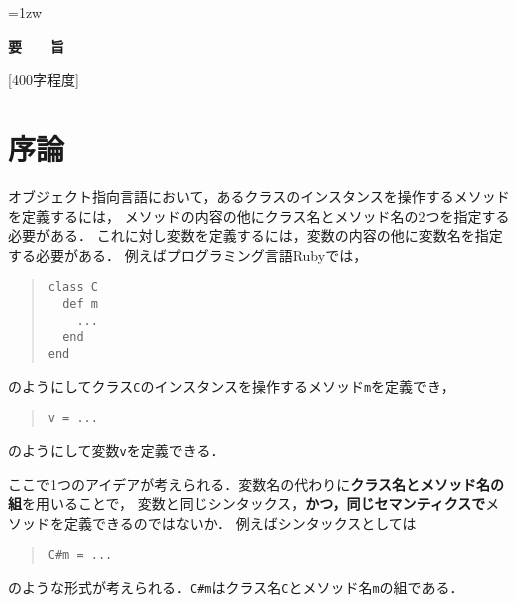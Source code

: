 \documentclass[a4paper,11pt,dvipdfmx]{jreport}
\title{\Underline{レキシカル環境にメソッドを定義する\\オブジェクト指向言語Suzu}}
\author{林 拓人}
\begin{document}
\maketitle
\thispagestyle{empty}
\newpage

\thispagestyle{empty}
\vspace*{20pt plus 1fil}
\parindent=1zw
\noindent
\begin{center}
{\Large \bf 要　　旨}
\vspace{2cm}
\end{center}
[400字程度]

\par
\vspace{0pt plus 1fil}
\newpage

\tableofcontents

\pagebreak \setcounter{page}{1}


\chapter{序論}

オブジェクト指向言語において，あるクラスのインスタンスを操作するメソッドを定義するには，
メソッドの内容の他にクラス名とメソッド名の2つを指定する必要がある．
これに対し変数を定義するには，変数の内容の他に変数名を指定する必要がある．
例えばプログラミング言語Rubyでは，
\begin{quote}
\begin{verbatim}
class C
  def m
    ...
  end
end
\end{verbatim}
\end{quote}
のようにしてクラス\verb|C|のインスタンスを操作するメソッド\verb|m|を定義でき，
\begin{quote}
\begin{verbatim}
v = ...
\end{verbatim}
\end{quote}
のようにして変数\verb|v|を定義できる．

ここで1つのアイデアが考えられる．変数名の代わりに\textbf{クラス名とメソッド名の組}を用いることで，
変数と同じシンタックス，\textbf{かつ，同じセマンティクスで}メソッドを定義できるのではないか．
例えばシンタックスとしては
\begin{quote}
\begin{verbatim}
C#m = ...
\end{verbatim}
\end{quote}
のような形式が考えられる．\verb|C#m|はクラス名\verb|C|とメソッド名\verb|m|の組である．
\end{document}
